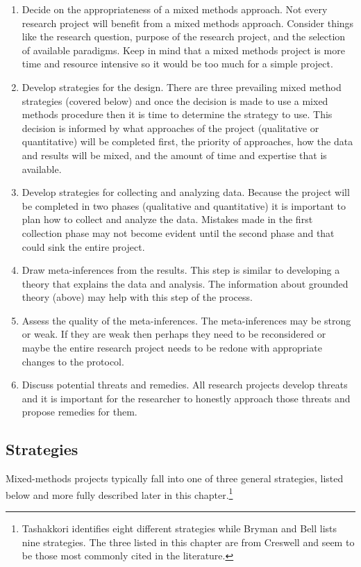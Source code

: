 \begin{enumerate}
	\item Decide on the appropriateness of a mixed methods approach. Not every research project will benefit from a mixed methods approach. Consider things like the research question, purpose of the research project, and the selection of available paradigms. Keep in mind that a mixed methods project is more time and resource intensive so it would be too much for a simple project.
	\item Develop strategies for the design. There are three prevailing mixed method strategies (covered below) and once the decision is made to use a mixed methods procedure then it is time to determine the strategy to use. This decision is informed by what approaches of the project (qualitative or quantitative) will be completed first, the priority of approaches, how the data and results will be mixed, and the amount of time and expertise that is available.
	\item Develop strategies for collecting and analyzing data. Because the project will be completed in two phases (qualitative and quantitative) it is important to plan how to collect and analyze the data. Mistakes made in the first collection phase may not become evident until the second phase and that could sink the entire project.
	\item Draw meta-inferences from the results. This step is similar to developing a theory that explains the data and analysis. The information about grounded theory (above) may help with this step of the process.
	\item Assess the quality of the meta-inferences. The meta-inferences may be strong or weak. If they are weak then perhaps they need to be reconsidered or maybe the entire research project needs to be redone with appropriate changes to the protocol.
	\item Discuss potential threats and remedies. All research projects develop threats and it is important for the researcher to honestly approach those threats and propose remedies for them.
\end{enumerate}

\subsection{Strategies}

Mixed-methods projects typically fall into one of three general strategies, listed below and more fully described later in this chapter.\footnote{Tashakkori\cite{tashakkori1998mixed} identifies eight different strategies while Bryman and Bell\cite{bell2015business} lists nine strategies. The three listed in this chapter are from Creswell\cite{creswell2014research} and seem to be those most commonly cited in the literature.}

